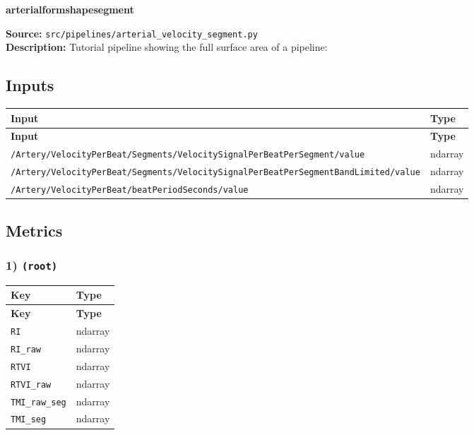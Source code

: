 \documentclass[11pt]{article}
\begin{document}
\begin{center}
\LARGE\textbf{arterialformshapesegment}
\end{center}
\textbf{Source:} \texttt{src/\allowbreak{}pipelines/\allowbreak{}arterial\_\allowbreak{}velocity\_\allowbreak{}segment.py}\\
\textbf{Description:} Tutorial pipeline showing the full surface area of a pipeline:

\subsection*{Inputs}
\begin{longtable}{|p{}|p{}|}
\hline
\textbf{Input} & \textbf{Type} \\ \hline
\endfirsthead
\hline
\textbf{Input} & \textbf{Type} \\ \hline
\endhead
{\scriptsize \texttt{/\allowbreak{}Artery/\allowbreak{}VelocityPerBeat/\allowbreak{}Segments/\allowbreak{}VelocitySignalPerBeatPerSegment/\allowbreak{}value}} & ndarray \\ \hline
{\scriptsize \texttt{/\allowbreak{}Artery/\allowbreak{}VelocityPerBeat/\allowbreak{}Segments/\allowbreak{}VelocitySignalPerBeatPerSegmentBandLimited/\allowbreak{}value}} & ndarray \\ \hline
{\scriptsize \texttt{/\allowbreak{}Artery/\allowbreak{}VelocityPerBeat/\allowbreak{}beatPeriodSeconds/\allowbreak{}value}} & ndarray \\ \hline
\end{longtable}

\subsection*{Metrics}
\subsubsection*{1) \texttt{(root)}}
\begin{longtable}{|p{}|p{}|}
\hline
\textbf{Key} & \textbf{Type} \\ \hline
\endfirsthead
\hline
\textbf{Key} & \textbf{Type} \\ \hline
\endhead
\texttt{RI} & ndarray \\ \hline
\texttt{RI\_\allowbreak{}raw} & ndarray \\ \hline
\texttt{RTVI} & ndarray \\ \hline
\texttt{RTVI\_\allowbreak{}raw} & ndarray \\ \hline
\texttt{TMI\_\allowbreak{}raw\_\allowbreak{}seg} & ndarray \\ \hline
\texttt{TMI\_\allowbreak{}seg} & ndarray \\ \hline
\end{longtable}
\end{document}
